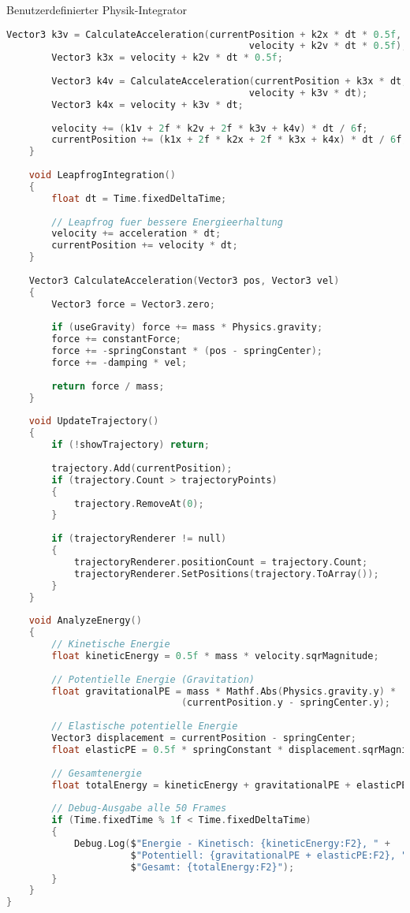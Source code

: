 \begin{code}{Benutzerdefinierter Physik-Integrator}
\begin{lstlisting}[language=C, style=basesmol]
        Vector3 k3v = CalculateAcceleration(currentPosition + k2x * dt * 0.5f, 
                                           velocity + k2v * dt * 0.5f);
        Vector3 k3x = velocity + k2v * dt * 0.5f;
        
        Vector3 k4v = CalculateAcceleration(currentPosition + k3x * dt, 
                                           velocity + k3v * dt);
        Vector3 k4x = velocity + k3v * dt;
        
        velocity += (k1v + 2f * k2v + 2f * k3v + k4v) * dt / 6f;
        currentPosition += (k1x + 2f * k2x + 2f * k3x + k4x) * dt / 6f;
    }
    
    void LeapfrogIntegration() 
    {
        float dt = Time.fixedDeltaTime;
        
        // Leapfrog fuer bessere Energieerhaltung
        velocity += acceleration * dt;
        currentPosition += velocity * dt;
    }
    
    Vector3 CalculateAcceleration(Vector3 pos, Vector3 vel) 
    {
        Vector3 force = Vector3.zero;
        
        if (useGravity) force += mass * Physics.gravity;
        force += constantForce;
        force += -springConstant * (pos - springCenter);
        force += -damping * vel;
        
        return force / mass;
    }
    
    void UpdateTrajectory() 
    {
        if (!showTrajectory) return;
        
        trajectory.Add(currentPosition);
        if (trajectory.Count > trajectoryPoints) 
        {
            trajectory.RemoveAt(0);
        }
        
        if (trajectoryRenderer != null) 
        {
            trajectoryRenderer.positionCount = trajectory.Count;
            trajectoryRenderer.SetPositions(trajectory.ToArray());
        }
    }
    
    void AnalyzeEnergy() 
    {
        // Kinetische Energie
        float kineticEnergy = 0.5f * mass * velocity.sqrMagnitude;
        
        // Potentielle Energie (Gravitation)
        float gravitationalPE = mass * Mathf.Abs(Physics.gravity.y) * 
                               (currentPosition.y - springCenter.y);
        
        // Elastische potentielle Energie
        Vector3 displacement = currentPosition - springCenter;
        float elasticPE = 0.5f * springConstant * displacement.sqrMagnitude;
        
        // Gesamtenergie
        float totalEnergy = kineticEnergy + gravitationalPE + elasticPE;
        
        // Debug-Ausgabe alle 50 Frames
        if (Time.fixedTime % 1f < Time.fixedDeltaTime) 
        {
            Debug.Log($"Energie - Kinetisch: {kineticEnergy:F2}, " +
                      $"Potentiell: {gravitationalPE + elasticPE:F2}, " +
                      $"Gesamt: {totalEnergy:F2}");
        }
    }
}
\end{lstlisting}
\end{code}

